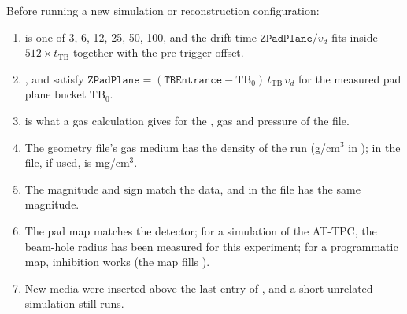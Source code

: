 Before running a new simulation or reconstruction configuration:
\begin{enumerate}
  \item {} is one of 3, 6, 12, 25, 50, 100, and the drift time
    $\mathtt{ZPadPlane}/v_d$ fits inside $512\times t_\mathrm{TB}$ together with the pre-trigger
    offset.
  \item {},  and  satisfy
    $\mathtt{ZPadPlane} = (\mathtt{TBEntrance} - \mathrm{TB}_0)\,t_\mathrm{TB}\,v_d$ for the measured pad
    plane bucket $\mathrm{TB}_0$.
  \item {} is what a gas calculation gives for the , gas and pressure of
    the file.
  \item The geometry file's gas medium has the density of the run (g/cm$^3$ in );
     in the  file, if used, is mg/cm$^3$.
  \item The  magnitude and sign match the data, and  in the
     file has the same magnitude.
  \item The pad map matches the detector; for a simulation of the AT-TPC, the beam-hole radius has been
    measured for this experiment; for a programmatic map, inhibition works (the map fills
    ).
  \item New media were inserted above the last entry of , and a short unrelated
    simulation still runs.
\end{enumerate}
